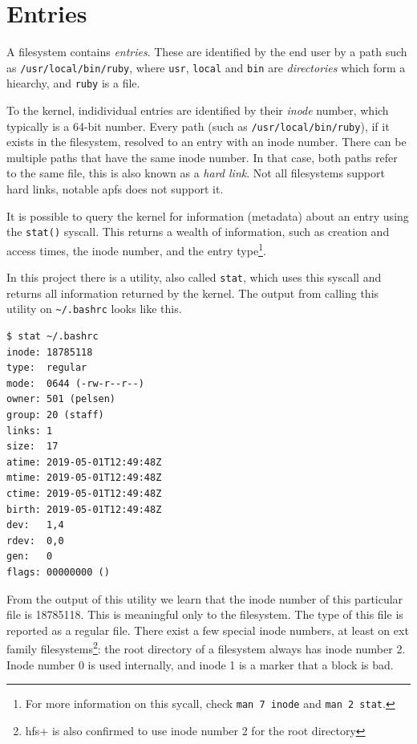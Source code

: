 \documentclass[a4paper]{article}
\begin{document}
\section{Entries}

A filesystem contains \emph{entries}. These are identified by the end user by a path such as \verb|/usr/local/bin/ruby|, where \verb|usr|, \verb|local| and \verb|bin| are \emph{directories} which form a hiearchy, and \verb|ruby| is a file. 

To the kernel, indidividual entries are identified by their \emph{inode} number, which typically is a 64-bit number. Every path (such as \verb|/usr/local/bin/ruby|), if it exists in the filesystem, resolved to an entry with an inode number. There can be multiple paths that have the same inode number. In that case, both paths refer to the same file, this is also known as a \emph{hard link}. Not all filesystems support hard links, notable \gls{apfs} does not support it.


It is possible to query the kernel for information (metadata) about an entry using the \verb|stat()| syscall. This returns a wealth of information, such as creation and access times, the inode number, and the entry type\footnote{For more information on this sycall, check \texttt{man 7 inode} and \texttt{man 2 stat}.}. 

In this project there is a utility, also called \verb|stat|, which uses this syscall and returns all information returned by the kernel. The output from calling this utility on \verb|~/.bashrc| looks like this.

\begin{verbatim}
$ stat ~/.bashrc
inode: 18785118
type:  regular
mode:  0644 (-rw-r--r--)
owner: 501 (pelsen)
group: 20 (staff)
links: 1
size:  17
atime: 2019-05-01T12:49:48Z
mtime: 2019-05-01T12:49:48Z
ctime: 2019-05-01T12:49:48Z
birth: 2019-05-01T12:49:48Z
dev:   1,4
rdev:  0,0
gen:   0
flags: 00000000 ()
\end{verbatim}
From the output of this utility we learn that the inode number of this particular file is 18785118. This is meaningful only to the filesystem. The type of this file is reported as a regular file. There exist a few special inode numbers, at least on \gls{ext} family filesystems\footnote{\gls{hfs+} is also confirmed to use inode number 2 for the root directory}: the root directory of a filesystem always has inode number 2. Inode number 0 is used internally, and inode 1 is a marker that a block is bad\cite{ext4-inodes}.
\end{document}
